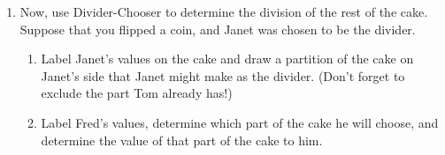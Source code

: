 \documentclass[12pt]{article}
\newcommand{\ans}[1][1in]{\rule{#1}{.5pt}}
\begin{document}
\begin{enumerate}
\begin{enumerate}
\item Now, use Divider-Chooser to determine the division of the rest of the cake. Suppose that you flipped a coin, and Janet was chosen to be the divider. 

\begin{enumerate}
\item Label Janet's values on the cake and draw a partition of the cake on Janet's side that Janet might make as the divider. (Don't forget to exclude the part Tom already has!)
\item Label Fred's values, determine which part of the cake he will choose, and determine the value of that part of the cake to him.
\end{enumerate}

\bigskip

\begin{center}
\def\r{1.2}
\hspace{1cm}
\end{center}

\end{enumerate}

\vfill




%
%
%
\end{enumerate}
\end{document}
